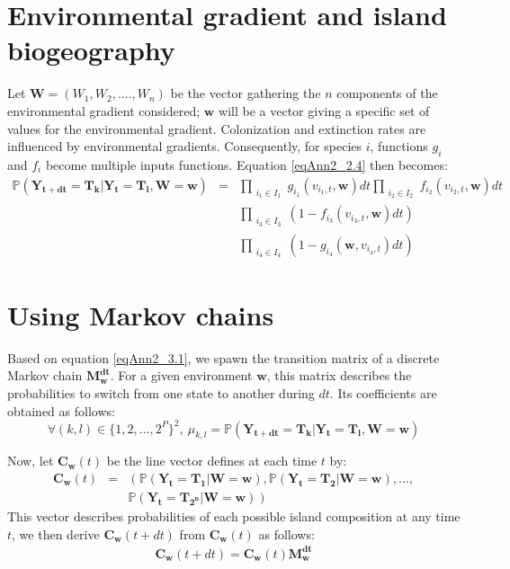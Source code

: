 \section{Environmental gradient and island biogeography}

Let $\mathbf{W}=(W_1, W_2, ...., W_n)$ be the vector gathering the $n$ components of the environmental gradient considered; $\mathbf{w}$ will be a vector giving a specific set of values for the environmental gradient. Colonization and extinction rates are influenced by environmental gradients. Consequently, for species $i$, functions $g_i$ and $f_i$ become multiple inputs functions. Equation \eqref{eqAnn2_2.4} then becomes:
\begin{eqnarray}
\nonumber \mathbb{P}(\mathbf{\mathbf{Y_{t+dt}}}=\mathbf{T_k}|\mathbf{\mathbf{Y_t}}=\mathbf{T_l}, \mathbf{W}=\mathbf{w})&=&\prod_{\substack{i_1\in I_1}}g_{i_1}(v_{i_1,t}, \mathbf{w})dt \prod_{\substack{i_2\in I_2}}f_{i_2}(v_{i_2,t}, \mathbf{w})dt \\
\nonumber  & & \prod_{\substack{i_3\in I_3}}(1-f_{i_3}(v_{i_3,t}, \mathbf{w})dt ) \\
\label{eqAnn2_3.1}  & & \prod_{\substack{i_4\in I_4}}(1-g_{i_4}(\mathbf{w}, v_{i_4,t})dt)
\end{eqnarray}



\section{Using Markov chains}

Based on equation \eqref{eqAnn2_3.1}, we spawn the transition matrix of a discrete Markov chain $\mathbf{M_w^{dt}}$. For a given environment $\mathbf{w}$, this matrix describes the probabilities to switch from one state to another during $dt$. Its coefficients are obtained as follows:
\begin{equation}
\label{eqAnn2_4.1} \forall (k,l)\in \{ 1,2,..., 2^P\}^2,~ \mu_{k,l}=\mathbb{P}(\mathbf{\mathbf{Y_{t+dt}}}=\mathbf{T_k}|\mathbf{\mathbf{Y_t}}=\mathbf{T_l}, \mathbf{W}=\mathbf{w})
\end{equation}

Now, let $\mathbf{C_w}(t)$ be the line vector defines at each time $t$ by:
\begin{eqnarray}
 \nonumber \mathbf{C_w}(t) &=& \left(\mathbb{P}(\mathbf{\mathbf{Y_t}}=\mathbf{T_1}|\mathbf{W}=\mathbf{w}), \mathbb{P}(\mathbf{\mathbf{Y_t}}=\mathbf{T_2}|\mathbf{W}=\mathbf{w}),...,\right. \\
 & & \left.\mathbb{P}(\mathbf{\mathbf{Y_t}}=\mathbf{T_{2^n}}|\mathbf{W}=\mathbf{w})\right)
\end{eqnarray}
 This vector describes probabilities of each possible island composition at any time $t$, we then derive $\mathbf{C_w}(t+dt)$ from $\mathbf{C_w}(t)$ as follows:
\begin{eqnarray}
\label{eqAnn2_4.2} \mathbf{C_w}(t+dt)=\mathbf{C_w}(t)\mathbf{M_w^{dt}}
\end{eqnarray}

